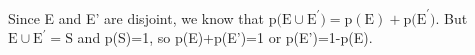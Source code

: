 Since E and E' are disjoint, we know that $ \mathrm{p(E} \cup \mathrm{E} ^{\prime} )
= \mathrm{p(E)+p(E} ^{\prime} {)}. $ But $ \mathrm{E} \cup \mathrm{E} ^{\prime}  = \mathrm{S} $
and p(S)=1, so p(E)+p(E')=1 or p(E')=1-p(E).